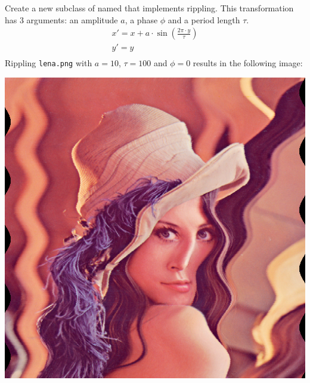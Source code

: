 \documentclass{book}
\begin{document}
\begin{exercise}
Create a new subclass of  named  that implements rippling. This transformation has 3 arguments: an amplitude $a$, a phase $\phi$ and a period length $\tau$. 
$$\begin{array}{c}
x' = x + a \cdot \sin(\frac{2\pi\cdot y}{\tau})\\
y' = y\\
\end{array}$$   
Rippling \texttt{lena.png} with $a=10$, $\tau=100$ and $\phi = 0$ results in the following image:
\begin{center}
\includegraphics[scale=0.2]{lena-rippled.png}
\end{center}
\end{exercise}
\end{document}
